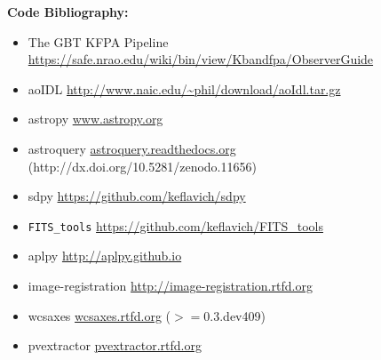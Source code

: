\textbf{Code Bibliography:} 
\begin{itemize}
    \item The GBT KFPA Pipeline \url{https://safe.nrao.edu/wiki/bin/view/Kbandfpa/ObserverGuide}
    \item aoIDL \url{http://www.naic.edu/~phil/download/aoIdl.tar.gz}
    \item astropy \url{www.astropy.org} \citep{Astropy-Collaboration2013a}
    \item astroquery \url{astroquery.readthedocs.org} (http://dx.doi.org/10.5281/zenodo.11656)
    \item sdpy \url{https://github.com/keflavich/sdpy}
    \item \texttt{FITS\_tools} \url{https://github.com/keflavich/FITS_tools}
    \item aplpy \url{http://aplpy.github.io}
    \item image-registration \url{http://image-registration.rtfd.org}
    \item wcsaxes \url{wcsaxes.rtfd.org} ($>=$0.3.dev409)
    \item pvextractor \url{pvextractor.rtfd.org}
\end{itemize}

%
%

